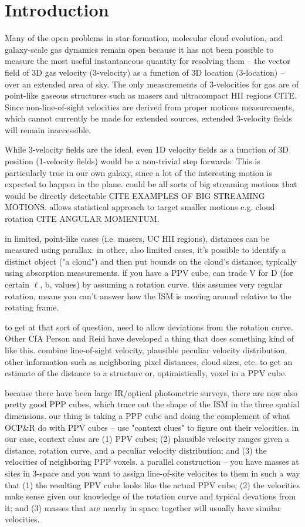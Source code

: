 \section{Introduction}
Many of the open problems in star formation, molecular cloud evolution, and galaxy-scale gas dynamics remain open because it has not been possible to measure the most useful instantaneous quantity for resolving them -- the vector field of 3D gas velocity (3-velocity) as a function of 3D location (3-location) -- over an extended area of sky. 
The only measurements of 3-velocities for gas are of point-like gaseous structures such as masers and ultracompact HII regions CITE.   
Since non-line-of-sight velocities are derived from proper motions measurements, which cannot currently be made for extended sources, extended 3-velocity fields will remain inaccessible.

While 3-velocity fields are the ideal, even 1D velocity fields as a function of 3D position (1-velocity fields) would be a non-trivial step forwards.
This is particularly true in our own galaxy, since a lot of the interesting motion is expected to happen in the plane.
could be all sorts of big streaming motions that would be directly detectable CITE EXAMPLES OF BIG STREAMING MOTIONS.
allows statistical approach to target smaller motions e.g. cloud rotation CITE ANGULAR MOMENTUM.

in limited, point-like cases (i.e. masers, UC HII regions), distances can be measured using parallax.
in other, also limited cases, it's possible to identify a distinct object ("a cloud") and then put bounds on the cloud's distance, typically using absorption measurements. 
if you have a PPV cube, can trade V for D (for certain $\ell$, b, values) by assuming a rotation curve. 
this assumes very regular rotation, means you can't answer how the ISM is moving around relative to the rotating frame.

to get at that sort of question, need to allow deviations from the rotation curve.
Other CfA Person and Reid have developed a thing that does something kind of like this. 
combine line-of-sight velocity, plausible peculiar velocity distribution, other information such as neighboring pixel distances, cloud sizes, etc. to get an estimate of the distance to a structure or, optimistically, voxel in a PPV cube.

because there have been large IR/optical photometric surveys, there are now also pretty good PPP cubes, which trace out the shape of the ISM in the three spatial dimensions. 
our thing is taking a PPP cube and doing the complement of what OCP\&R do with PPV cubes -- use "context clues" to figure out their velocities.
in our case, context clues are (1) PPV cubes; (2) plausible velocity ranges given a distance, rotation curve, and a peculiar velocity distribution; and (3) the velocities of neighboring PPP voxels. 
a parallel construction -- you have masses at sites in 3-space and you want to assign line-of-site velocites to them in such a way that (1) the resulting PPV cube looks like the actual PPV cube; (2) the velocities make sense given our knowledge of the rotation curve and typical devations from it; and (3) masses that are nearby in space together will usually have similar velocities.

